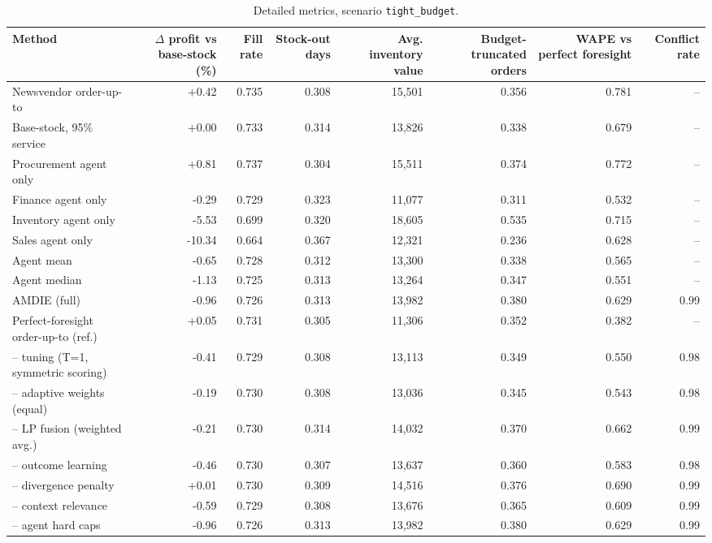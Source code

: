\begin{table}[t]
\centering\small
\caption{Detailed metrics, scenario \texttt{tight\_budget}.}\label{tab:detail-tight_budget}
\begin{tabular}{lrrrrrrr}
\toprule
Method & $\Delta$ profit vs base-stock (\%) & Fill rate & Stock-out days & Avg. inventory value & Budget-truncated orders & WAPE vs perfect foresight & Conflict rate \\
\midrule
Newsvendor order-up-to & +0.42 & 0.735 & 0.308 & 15,501 & 0.356 & 0.781 & -- \\
Base-stock, 95\% service & +0.00 & 0.733 & 0.314 & 13,826 & 0.338 & 0.679 & -- \\
Procurement agent only & +0.81 & 0.737 & 0.304 & 15,511 & 0.374 & 0.772 & -- \\
Finance agent only & -0.29 & 0.729 & 0.323 & 11,077 & 0.311 & 0.532 & -- \\
Inventory agent only & -5.53 & 0.699 & 0.320 & 18,605 & 0.535 & 0.715 & -- \\
Sales agent only & -10.34 & 0.664 & 0.367 & 12,321 & 0.236 & 0.628 & -- \\
Agent mean & -0.65 & 0.728 & 0.312 & 13,300 & 0.338 & 0.565 & -- \\
Agent median & -1.13 & 0.725 & 0.313 & 13,264 & 0.347 & 0.551 & -- \\
AMDIE (full) & -0.96 & 0.726 & 0.313 & 13,982 & 0.380 & 0.629 & 0.99 \\
Perfect-foresight order-up-to (ref.) & +0.05 & 0.731 & 0.305 & 11,306 & 0.352 & 0.382 & -- \\
-- tuning (T=1, symmetric scoring) & -0.41 & 0.729 & 0.308 & 13,113 & 0.349 & 0.550 & 0.98 \\
-- adaptive weights (equal) & -0.19 & 0.730 & 0.308 & 13,036 & 0.345 & 0.543 & 0.98 \\
-- LP fusion (weighted avg.) & -0.21 & 0.730 & 0.314 & 14,032 & 0.370 & 0.662 & 0.99 \\
-- outcome learning & -0.46 & 0.730 & 0.307 & 13,637 & 0.360 & 0.583 & 0.98 \\
-- divergence penalty & +0.01 & 0.730 & 0.309 & 14,516 & 0.376 & 0.690 & 0.99 \\
-- context relevance & -0.59 & 0.729 & 0.308 & 13,676 & 0.365 & 0.609 & 0.99 \\
-- agent hard caps & -0.96 & 0.726 & 0.313 & 13,982 & 0.380 & 0.629 & 0.99 \\
\bottomrule
\end{tabular}
\end{table}

